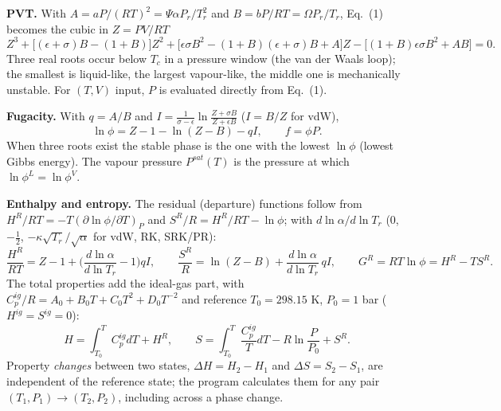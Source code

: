 \documentclass[10pt,a4paper]{article}
\begin{document}
\textbf{PVT.} With $A=aP/(RT)^2=\Psi\alpha P_r/T_r^2$ and $B=bP/RT=\Omega P_r/T_r$, Eq.~(1) becomes the cubic in $Z=PV/RT$
\begin{equation}
Z^3+\big[(\epsilon+\sigma)B-(1+B)\big]Z^2+\big[\epsilon\sigma B^2-(1+B)(\epsilon+\sigma)B+A\big]Z-\big[(1+B)\epsilon\sigma B^2+AB\big]=0 .
\end{equation}
Three real roots occur below $T_c$ in a pressure window (the van der Waals loop); the smallest is liquid-like, the largest vapour-like, the middle one is mechanically unstable. For $(T,V)$ input, $P$ is evaluated directly from Eq.~(1).

\textbf{Fugacity.} With $q=A/B$ and $I=\frac{1}{\sigma-\epsilon}\ln\frac{Z+\sigma B}{Z+\epsilon B}$ ($I=B/Z$ for vdW),
\begin{equation}
\ln\phi=Z-1-\ln(Z-B)-qI,\qquad f=\phi P .
\end{equation}
When three roots exist the stable phase is the one with the lowest $\ln\phi$ (lowest Gibbs energy). The vapour pressure $P^{sat}(T)$ is the pressure at which $\ln\phi^L=\ln\phi^V$.

\textbf{Enthalpy and entropy.} The residual (departure) functions follow from $H^R/RT=-T(\partial\ln\phi/\partial T)_P$ and $S^R/R=H^R/RT-\ln\phi$; with $d\!\ln\alpha/d\!\ln T_r$ (0, $-\tfrac12$, $-\kappa\sqrt{T_r}/\sqrt\alpha$ for vdW, RK, SRK/PR):
\begin{equation}
\frac{H^R}{RT}=Z-1+\Big(\frac{d\ln\alpha}{d\ln T_r}-1\Big)qI,\qquad
\frac{S^R}{R}=\ln(Z-B)+\frac{d\ln\alpha}{d\ln T_r}\,qI,\qquad G^R=RT\ln\phi=H^R-TS^R .
\end{equation}
The total properties add the ideal-gas part, with $C_p^{ig}/R=A_0+B_0T+C_0T^2+D_0T^{-2}$ and reference $T_0=298.15$ K, $P_0=1$ bar ($H^{ig}=S^{ig}=0$):
\begin{equation}
H=\int_{T_0}^{T}C_p^{ig}dT+H^R,\qquad S=\int_{T_0}^{T}\frac{C_p^{ig}}{T}dT-R\ln\frac{P}{P_0}+S^R .
\end{equation}
Property \emph{changes} between two states, $\Delta H=H_2-H_1$ and $\Delta S=S_2-S_1$, are independent of the reference state; the program calculates them for any pair $(T_1,P_1)\to(T_2,P_2)$, including across a phase change.
\end{document}
